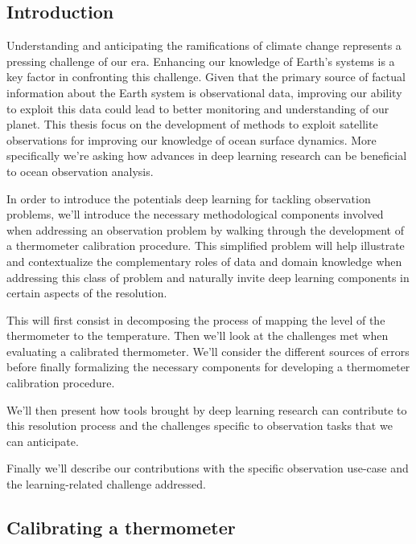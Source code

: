 \begin{bibunit}

\chapter*{Introduction}



Understanding and anticipating the ramifications of climate change represents a pressing challenge of our era. Enhancing our knowledge of Earth's systems is a key factor in confronting this challenge.
  Given that the primary source of factual information about the Earth system is observational data, improving our ability to exploit this data could lead to better monitoring and understanding of our planet.
  This thesis focus on the development of methods to exploit satellite observations for improving our knowledge of ocean surface dynamics. 
  More specifically we're asking how advances in deep learning research can be beneficial to ocean observation analysis.
  
  In order to introduce the potentials deep learning for tackling observation problems, we'll introduce the necessary methodological components involved when addressing an observation problem by walking through the development of a thermometer calibration procedure. This simplified problem will help illustrate and contextualize the complementary roles of data and domain knowledge when addressing this class of problem and naturally invite deep learning components in certain aspects of the resolution. 
  
  This will first consist in decomposing the process of mapping the level of the thermometer to the temperature. Then we'll look at the challenges met when evaluating a calibrated thermometer. We'll consider the different sources of errors before finally formalizing the necessary components for developing a thermometer calibration procedure.

  We'll then present how tools brought by deep learning research can contribute to this resolution process and the challenges specific to observation tasks that we can anticipate.

  Finally we'll describe our contributions with the specific observation use-case and the learning-related challenge addressed. 
  
  \section{Calibrating a thermometer}

\end{bibunit}
